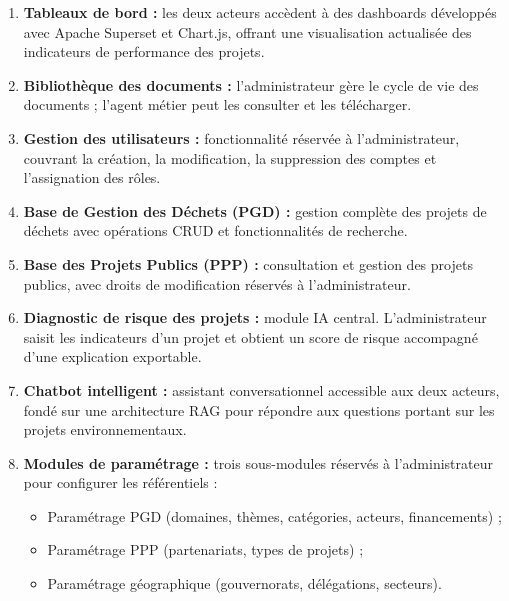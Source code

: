 \begin{enumerate}
    \item \textbf{Tableaux de bord :} les deux acteurs accèdent
    à des dashboards développés avec Apache Superset et Chart.js,
    offrant une visualisation actualisée des indicateurs de
    performance des projets.

    \item \textbf{Bibliothèque des documents :} l'administrateur
    gère le cycle de vie des documents ; l'agent métier peut les
    consulter et les télécharger.

    \item \textbf{Gestion des utilisateurs :} fonctionnalité réservée
    à l'administrateur, couvrant la création, la modification, la
    suppression des comptes et l'assignation des rôles.

    \item \textbf{Base de Gestion des Déchets (PGD) :} gestion
    complète des projets de déchets avec opérations CRUD et
    fonctionnalités de recherche.

    \item \textbf{Base des Projets Publics (PPP) :} consultation et
    gestion des projets publics, avec droits de modification réservés
    à l'administrateur.

    \item \textbf{Diagnostic de risque des projets :} module IA
    central. L'administrateur saisit les indicateurs d'un projet
    et obtient un score de risque accompagné d'une explication
    exportable.

    \item \textbf{Chatbot intelligent :} assistant conversationnel
    accessible aux deux acteurs, fondé sur une architecture RAG
    pour répondre aux questions portant sur les projets
    environnementaux.

    \item \textbf{Modules de paramétrage :} trois sous-modules
    réservés à l'administrateur pour configurer les référentiels :
    \begin{itemize}
        \item Paramétrage PGD (domaines, thèmes, catégories, acteurs,
              financements) ;
        \item Paramétrage PPP (partenariats, types de projets) ;
        \item Paramétrage géographique (gouvernorats, délégations,
              secteurs).
    \end{itemize}
\end{enumerate}

